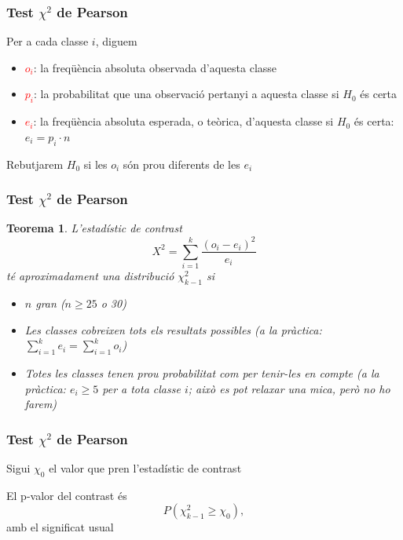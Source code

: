 \documentclass[12pt,t]{beamer}
\newcommand{\red}[1]{\textcolor{red}{#1}}
\renewcommand{\emph}[1]{{\color{red}#1}}
\renewcommand{\geq}{\geqslant}
\theoremstyle{plain}
\newtheorem{teorema}{Teorema}
\theoremstyle{definition}
\begin{document}
\begin{frame}
\frametitle{Test $\chi^2$ de Pearson}

Per a cada classe $i$, diguem
\begin{itemize}
\item \red{$o_i$}: la freqüència absoluta \emph{observada} d'aquesta classe
\medskip

\item \red{$p_i$}: la probabilitat  que una observació pertanyi a aquesta classe si $H_0$ és certa
\medskip

\item \red{$e_i$}: la freqüència absoluta \emph{esperada}, o \emph{teòrica}, d'aquesta classe  si $H_0$ és certa: $e_i=p_i\cdot n$
\end{itemize}
\bigskip

Rebutjarem $H_0$ si les $o_i$ són prou diferents de les $e_i$


\end{frame}

\begin{frame}
\frametitle{Test $\chi^2$ de Pearson}
\vspace*{-2ex}

\begin{teorema}
L'estadístic de contrast
$$
X^2=\sum_{i=1}^k \frac{(o_{i}-e_{i})^2}{e_{i}}
$$
té aproximadament una distribució $\chi_{k-1}^2$ si 
\begin{itemize}
\item $n$ gran ($n\geq 25$ o 30)
\medskip


\item Les classes cobreixen tots els resultats possibles (a la pràctica: $\sum_{i=1}^ke_i=\sum_{i=1}^k o_i$)
\medskip


\item  Totes les classes tenen prou probabilitat com per tenir-les en compte (a la pràctica: $e_i\geq 5$ per a tota classe $i$; això es pot relaxar una mica, però no ho farem)
\end{itemize}
\end{teorema}

\end{frame}




\begin{frame}
\frametitle{Test $\chi^2$ de Pearson}
Sigui $\chi_0$ el valor que pren l'estadístic de contrast
\bigskip

El \emph{p-valor} del contrast és
$$
P(\chi_{k-1}^2\geq \chi_0),
$$
amb el significat usual
\end{frame}
\end{document}
